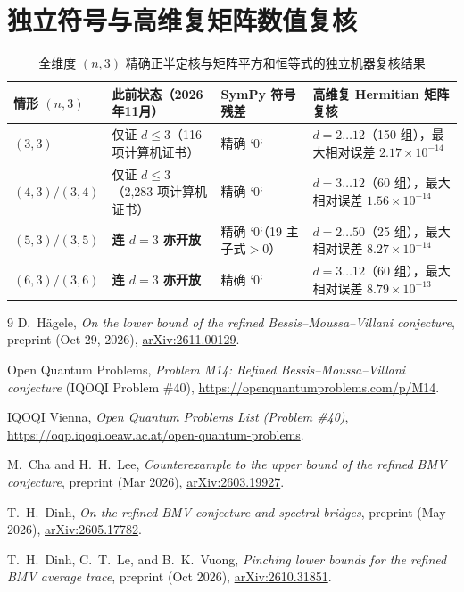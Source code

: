 \documentclass[11pt,a4paper]{article}
\theoremstyle{remark}
\begin{document}
\section{独立符号与高维复矩阵数值复核}

\begin{table}[!htbp]
\centering
\caption{全维度 $(n,3)$ 精确正半定核与矩阵平方和恒等式的独立机器复核结果}
\label{tab:verify}
\begin{tabularx}{\linewidth}{lXlX}
\toprule
情形 $(n,3)$ & 此前状态（2026年11月） & SymPy 符号残差 & 高维复 Hermitian 矩阵复核 \\
\midrule
$(3,3)$ & 仅证 $d\le 3$（116 项计算机证书） & 精确 `0` & $d=2\dots 12$（150 组），最大相对误差 $2.17\times 10^{-14}$ \\
$(4,3)/(3,4)$ & 仅证 $d\le 3$（2,283 项计算机证书） & 精确 `0` & $d=3\dots 12$（60 组），最大相对误差 $1.56\times 10^{-14}$ \\
$(5,3)/(3,5)$ & \textbf{连 $d=3$ 亦开放} & 精确 `0`（19 主子式$>0$） & $d=2\dots 50$（25 组），最大相对误差 $8.27\times 10^{-14}$ \\
$(6,3)/(3,6)$ & \textbf{连 $d=3$ 亦开放} & 精确 `0` & $d=3\dots 12$（60 组），最大相对误差 $8.79\times 10^{-13}$ \\
\bottomrule
\end{tabularx}
\end{table}

\begin{thebibliography}{9}
D.~H\"agele, \emph{On the lower bound of the refined Bessis--Moussa--Villani conjecture}, preprint (Oct 29, 2026), \href{https://arxiv.org/html/2611.00129v1}{arXiv:2611.00129}.

Open Quantum Problems, \emph{Problem M14: Refined Bessis--Moussa--Villani conjecture} (IQOQI Problem \#40), \url{https://openquantumproblems.com/p/M14}.

IQOQI Vienna, \emph{Open Quantum Problems List (Problem \#40)}, \url{https://oqp.iqoqi.oeaw.ac.at/open-quantum-problems}.

M.~Cha and H.~H.~Lee, \emph{Counterexample to the upper bound of the refined BMV conjecture}, preprint (Mar 2026), \href{https://arxiv.org/abs/2603.19927}{arXiv:2603.19927}.

T.~H.~Dinh, \emph{On the refined BMV conjecture and spectral bridges}, preprint (May 2026), \href{https://arxiv.org/html/2605.17782v1}{arXiv:2605.17782}.

T.~H.~Dinh, C.~T.~Le, and B.~K.~Vuong, \emph{Pinching lower bounds for the refined BMV average trace}, preprint (Oct 2026), \href{https://arxiv.org/html/2610.31851v1}{arXiv:2610.31851}.
\end{thebibliography}
\end{document}
